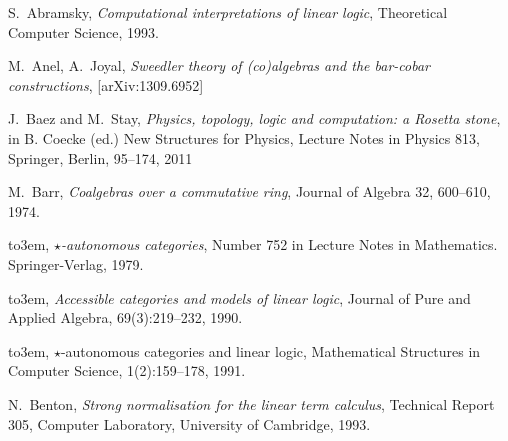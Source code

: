 \documentclass[english,letter paper,12pt,reqno]{article}
\theoremstyle{example}
\numberwithin{equation}{section}
\begin{document}

\providecommand{\bysame}{\leavevmode\hbox to3em{\hrulefill}\thinspace}
\providecommand{\href}[2]{#2}
\begin{thebibliography}{BHLS03}

S.~Abramsky, \textsl{Computational interpretations of linear logic}, Theoretical Computer Science, 1993.




M.~Anel, A.~Joyal, \textsl{Sweedler theory of (co)algebras and the bar-cobar constructions}, \href{http://arxiv.org/abs/1309.6952}{[arXiv:1309.6952]}


J.~Baez and M.~Stay, \textsl{Physics, topology, logic and computation: a Rosetta stone}, in B. Coecke (ed.) New Structures for Physics, Lecture Notes in Physics 813, Springer, Berlin, 95--174, 2011

M.~Barr, \textsl{Coalgebras over a commutative ring}, Journal of Algebra 32, 600--610, 1974.

\bysame, \textsl{$\star$-autonomous categories}, Number 752 in Lecture Notes in Mathematics. Springer-Verlag, 1979.

\bysame, \textsl{Accessible categories and models of linear logic}, Journal of Pure and Applied Algebra, 69(3):219--232, 1990.

\bysame, {$\star$-autonomous categories and linear logic}, Mathematical Structures in Computer Science, 1(2):159--178, 1991.


N.~Benton, \textsl{Strong normalisation for the linear term calculus}, Technical Report 305, Computer Laboratory, University of Cambridge, 1993.


\end{thebibliography}
\end{document}
